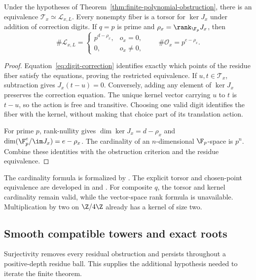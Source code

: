\begin{theorem}\label{thm:lift-torsor-count}
Under the hypotheses of Theorem~\ref{thm:finite-polynomial-obstruction},
there is an equivalence $\mathcal T_x\simeq\mathcal L_{x,L}$.
Every nonempty fiber is a torsor for $\ker J_x$ under addition of
correction digits. If $q=p$ is prime and
$\rho_x=\rank_{\F_p}J_x$, then
\begin{equation}\label{eq:lift-count}
 \#\mathcal L_{x,L}=
 \begin{cases}p^{d-\rho_x},&o_x=0,\\0,&o_x\ne0,\end{cases}
 \qquad
 \#\mathcal O_x=p^{e-\rho_x}.
\end{equation}
\end{theorem}

\begin{proof}
Equation~\eqref{eq:digit-correction} identifies exactly which points of the
residue fiber satisfy the equations, proving the restricted equivalence.
If $u,t\in\mathcal T_x$, subtraction gives $J_x(t-u)=0$. Conversely,
adding any element of $\ker J_x$ preserves the correction equation. The
unique kernel vector carrying $u$ to $t$ is $t-u$, so the action is free
and transitive. Choosing one valid digit identifies the fiber with the
kernel, without making that choice part of its translation action.

For prime $p$, rank-nullity gives
$\dim\ker J_x=d-\rho_x$ and
$\dim(\F_p^e/\im J_x)=e-\rho_x$. The cardinality of an
$n$-dimensional $\F_p$-space is $p^n$. Combine these identities with the
obstruction criterion and the residue equivalence.
\end{proof}

The cardinality formula is formalized by
.
The explicit torsor and chosen-point equivalence are developed in
 and
.
For composite $q$, the torsor and kernel cardinality remain valid, while the
vector-space rank formula is unavailable. Multiplication by two on
$\Z/4\Z$ already has a kernel of size two.

\subsection{Smooth compatible towers and exact roots}

Surjectivity removes every residual obstruction and persists throughout a
positive-depth residue ball. This supplies the additional hypothesis needed
to iterate the finite theorem.

